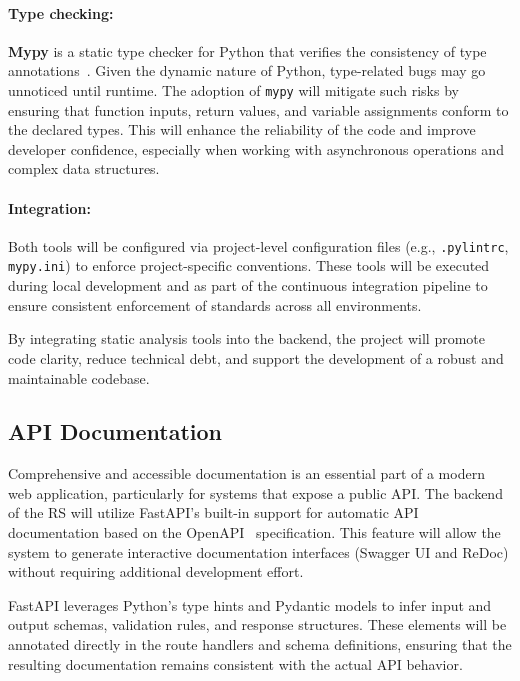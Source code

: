 \paragraph{Type checking:}
\textbf{Mypy} is a static type checker for Python that verifies the consistency of type annotations~\cite{mypy}. Given the dynamic nature of Python, type-related bugs may go unnoticed until runtime. The adoption of \texttt{mypy} will mitigate such risks by ensuring that function inputs, return values, and variable assignments conform to the declared types. This will enhance the reliability of the code and improve developer confidence, especially when working with asynchronous operations and complex data structures.

\paragraph{Integration:}
Both tools will be configured via project-level configuration files (e.g., \texttt{.pylintrc}, \texttt{mypy.ini}) to enforce project-specific conventions. These tools will be executed during local development and as part of the continuous integration pipeline to ensure consistent enforcement of standards across all environments.

By integrating static analysis tools into the backend, the project will promote code clarity, reduce technical debt, and support the development of a robust and maintainable codebase.

\subsection{API Documentation}

Comprehensive and accessible documentation is an essential part of a modern web application, particularly for systems that expose a public API. The backend of the RS will utilize FastAPI’s built-in support for automatic API documentation based on the OpenAPI~\cite{OpenAPI} specification. This feature will allow the system to generate interactive documentation interfaces (Swagger UI and ReDoc) without requiring additional development effort.

FastAPI leverages Python's type hints and Pydantic models to infer input and output schemas, validation rules, and response structures. These elements will be annotated directly in the route handlers and schema definitions, ensuring that the resulting documentation remains consistent with the actual API behavior.


